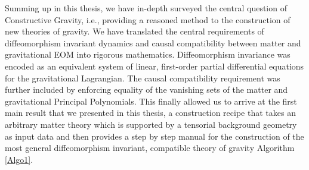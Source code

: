 Summing up in this thesis, we have in-depth surveyed the central question of Constructive Gravity, i.e., providing a reasoned method to the construction of new theories of gravity. We have translated the central requirements of diffeomorphism invariant dynamics and causal compatibility between matter and gravitational EOM into rigorous mathematics. Diffeomorphism invariance was encoded as an equivalent system of linear, first-order partial differential equations for the gravitational Lagrangian. The causal compatibility requirement was further included by enforcing equality of the vanishing sets of the matter and gravitational Principal Polynomials.
This finally allowed us to arrive at the first main result that we presented in this thesis, a construction recipe that takes an arbitrary matter theory which is supported by a tensorial background geometry as input data and then provides a step by step manual for the construction of the most general diffeomorphism invariant, compatible theory of gravity Algorithm \ref{Algo1}. 


